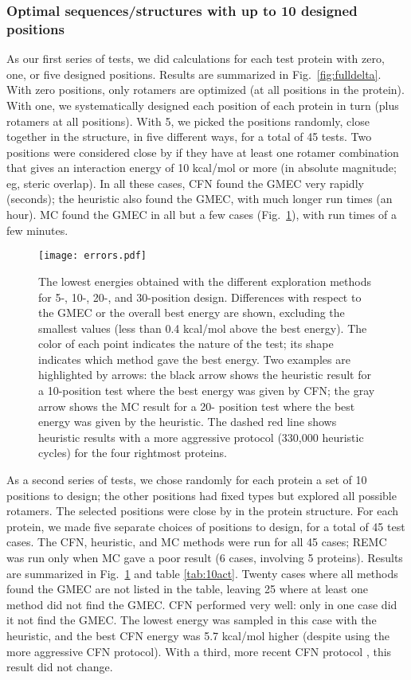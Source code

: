 \subsubsection{Optimal sequences/structures with up to 10 designed positions}
As our first series of tests, we did calculations for each test protein with zero, one, or five designed positions. Results are summarized in Fig.\ \ref{fig:fulldelta}. With zero positions, only rotamers are optimized (at all positions in the protein). With one, we systematically designed each position of each protein in turn (plus rotamers at all positions). With 5, we picked the positions randomly, close together in the structure, in five different ways, for a total of 45 tests. Two positions were considered close by if they have at least one rotamer combination that gives an interaction energy of 10 kcal/mol or more (in absolute magnitude; eg, steric overlap). In all these cases, CFN found the GMEC very rapidly (seconds); the heuristic also found the GMEC, with much longer run times (an hour). MC found the GMEC in all but a few cases (Fig.\ \ref{fig:errors}), with run times of a few minutes. 

\begin{figure}[!htbp]
  \begin{center}
    \texttt{[image: errors.pdf]} 
  \end{center}
  \caption{The lowest energies obtained with the different exploration
methods for 5-, 10-, 20-, and 30-position design. Differences with respect
to the GMEC or the overall best energy are shown, excluding the smallest
values (less than 0.4 kcal/mol above the best energy). The color of each
point indicates the nature of the test; its shape indicates which method
gave the best energy. Two examples are highlighted by arrows: the black
arrow shows the heuristic result for a 10-position test where the best
energy was given by CFN; the gray arrow shows the MC result for a 20-
position test where the best energy was given by the heuristic. The dashed
red line shows heuristic results with a more aggressive protocol (330,000
heuristic cycles) for the four rightmost proteins.
}
      \label{fig:errors}
\end{figure}

As a second series of tests, we chose randomly for each protein a set of 10 positions to design; the other positions had fixed types but explored all possible rotamers. The selected positions were close by in the protein structure. For each protein, we made five separate choices of positions to design, for a total of 45 test cases. The CFN, heuristic, and MC methods were run for all 45 cases; REMC was run only when MC gave a poor result (6 cases, involving 5 proteins).
Results are summarized in Fig.\ \ref{fig:errors} and table \ref{tab:10act}. Twenty cases where all methods found the GMEC are not listed in the table, leaving 25 where at least one method did not find the GMEC. CFN performed very well: only in one case did it not find the GMEC. The lowest energy was sampled in this case with the heuristic, and the best CFN energy was 5.7 kcal/mol higher (despite using the more aggressive CFN protocol). With a third, more recent CFN protocol \cite{Simoncini15}, this result did not change. 

